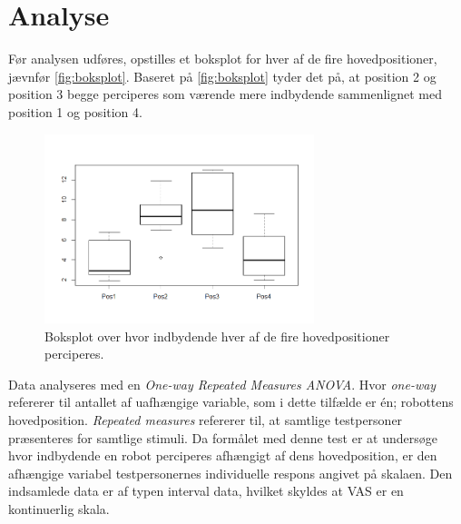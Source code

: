 \section*{Analyse}
\label{Analyse}
%
Før analysen udføres, opstilles et boksplot for hver af de fire hovedpositioner, jævnfør \autoref{fig:boksplot}. Baseret på \autoref{fig:boksplot} tyder det på, at position 2 og position 3 begge perciperes som værende mere indbydende sammenlignet med position 1 og position 4.   
%
\begin{figure}[H]
\centering
\includegraphics[width = 0.7\textwidth]{Figure/Rplot.png} 
\caption{Boksplot over hvor indbydende hver af de fire hovedpositioner perciperes.}
\label{fig:boksplot}
\end{figure}
\noindent
%
Data analyseres med en \textit{One-way Repeated Measures ANOVA}. Hvor \textit{one-way} refererer til antallet af uafhængige variable, som i dette tilfælde er én; robottens hovedposition. \textit{Repeated measures} refererer til, at samtlige testpersoner præsenteres for samtlige stimuli. Da formålet med denne test er at undersøge hvor indbydende en robot perciperes afhængigt af dens hovedposition, er den afhængige variabel testpersonernes individuelle respons angivet på skalaen. Den indsamlede data er af typen interval data, hvilket skyldes at VAS er en kontinuerlig skala. 

